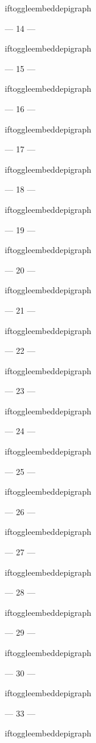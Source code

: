 {iftoggle{embeddepigraph}{}{}

\filbreak
--- 14 ---

iftoggle{embeddepigraph}{}{}

\filbreak
--- 15 ---

iftoggle{embeddepigraph}{}{}

\filbreak
--- 16 ---

iftoggle{embeddepigraph}{}{}

\filbreak
--- 17 ---

iftoggle{embeddepigraph}{}{}

\filbreak
--- 18 ---

iftoggle{embeddepigraph}{}{}

\filbreak
--- 19 ---

iftoggle{embeddepigraph}{}{}

\filbreak
--- 20 ---

iftoggle{embeddepigraph}{}{}

\filbreak
--- 21 ---

iftoggle{embeddepigraph}{}{}

\filbreak
--- 22 ---

iftoggle{embeddepigraph}{}{}

\filbreak
--- 23 ---

iftoggle{embeddepigraph}{}{}

\filbreak
--- 24 ---

iftoggle{embeddepigraph}{}{}

\filbreak
--- 25 ---

iftoggle{embeddepigraph}{}{}

\filbreak
--- 26 ---

iftoggle{embeddepigraph}{}{}

\filbreak
--- 27 ---

iftoggle{embeddepigraph}{}{}

\filbreak
--- 28 ---
 
iftoggle{embeddepigraph}{}{}

\filbreak
--- 29 ---

iftoggle{embeddepigraph}{}{}

\filbreak
--- 30 ---

iftoggle{embeddepigraph}{}{}

\filbreak
--- 33 ---

iftoggle{embeddepigraph}{}{}
} %

